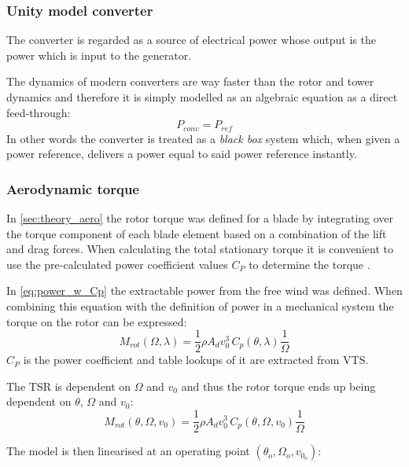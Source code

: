 \subsubsection{Unity model converter} \label{sec:wtLin_conv_unity}
The converter is regarded as a source of electrical power whose output is the power which is input to the generator.

The dynamics of modern converters are way faster than the rotor and tower dynamics and therefore it is simply modelled as an algebraic equation as a direct feed-through:
\begin{equation}\label{eq:wtLin_comp_convdft}
	P_{conv} = P_{ref}
\end{equation}
In other words the converter is treated as a \textit{black box} system which, when given a power reference, delivers a power equal to said power reference instantly.


\subsubsection{Aerodynamic torque} \label{sec:wtLin_aero_torque}
In \cref{sec:theory_aero} the rotor torque was defined for a blade by integrating over the torque component of each blade element based on a combination of the lift and drag forces. When calculating the total stationary torque it is convenient to use the pre-calculated power coefficient values $ C_P $ to determine the torque \cite{Knudsen2013}.

In \cref{eq:power_w_Cp} the extractable power from the free wind was defined. When combining this equation with the definition of power in a mechanical system the torque on the rotor can be expressed:
\begin{equation}\label{eq:wtLin_Mrot_lambda}
	M_{rot}(\Omega, \lambda) = \dfrac{1}{2} \rho A_d v_0^3 \, C_p(\theta, \lambda) \dfrac{1}{\Omega}
\end{equation}
$ C_P $ is the power coefficient and table lookups of it are extracted from VTS.

The TSR is dependent on $ \Omega $ and $ v_0 $ and thus the rotor torque ends up being dependent on $ \theta $, $ \Omega $ and $ v_0 $:
\begin{equation}\label{eq:wtLin_Mrot_wind}
	M_{rot}(\theta, \Omega, v_0) = \dfrac{1}{2} \rho A_d v_0^3 \, C_p(\theta, \Omega, v_0) \dfrac{1}{\Omega}
\end{equation}




The model is then linearised at an operating point $ (\theta_o, \Omega_o, v_{0_o}) $:

